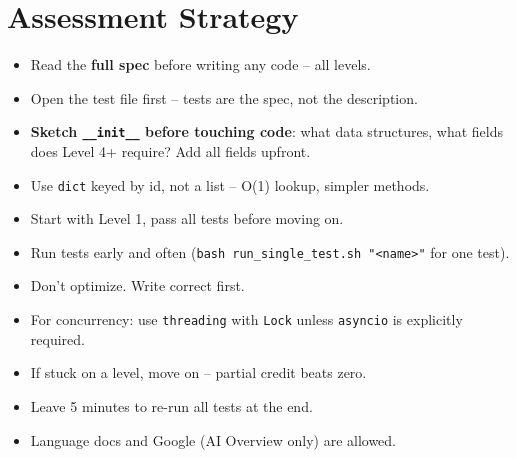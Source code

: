 \documentclass[10pt,letterpaper]{article}
\begin{document}
\section{Assessment Strategy}

\begin{itemize}[noitemsep]
  \item Read the \textbf{full spec} before writing any code -- all levels.
  \item Open the test file first -- tests are the spec, not the description.
  \item \textbf{Sketch \texttt{\_\_init\_\_} before touching code}: what data structures, what fields does Level 4+ require? Add all fields upfront.
  \item Use \texttt{dict} keyed by id, not a list -- O(1) lookup, simpler methods.
  \item Start with Level 1, pass all tests before moving on.
  \item Run tests early and often (\texttt{bash run\_single\_test.sh "<name>"} for one test).
  \item Don't optimize. Write correct first.
  \item For concurrency: use \texttt{threading} with \texttt{Lock} unless \texttt{asyncio} is explicitly required.
  \item If stuck on a level, move on -- partial credit beats zero.
  \item Leave 5 minutes to re-run all tests at the end.
  \item Language docs and Google (AI Overview only) are allowed.
\end{itemize}
\end{document}
